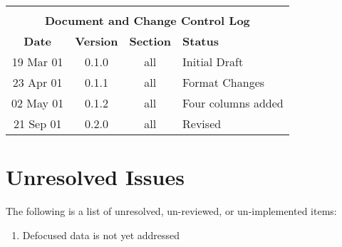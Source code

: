\documentclass[twoside]{article}
\begin{document}
\begin{center}
\begin{tabular}{|c|c|c|p{2.5in}|} \hline
\multicolumn{4}{|c|}{}\\[1mm]
\multicolumn{4}{|c|}{\bf Document and Change Control Log}\\[3mm]\hline
{\bf Date} & {\bf Version} & {\bf Section} & {\bf Status} \\ \hline
19 Mar 01& 0.1.0& all&Initial Draft \\\hline
23 Apr 01& 0.1.1& all&Format Changes \\\hline
02 May 01& 0.1.2& all&Four columns added \\\hline
21 Sep 01& 0.2.0& all&Revised \\\hline
%
\hline
%
\end{tabular}
\end{center}

\section*{Unresolved Issues}

The following is a list of unresolved, un-reviewed, or un-implemented
items: 

\begin{enumerate}

\item Defocused data is not yet addressed

\end{enumerate}

\clearpage



\tableofcontents
\clearpage
\listoftables
\clearpage

\end{document}
